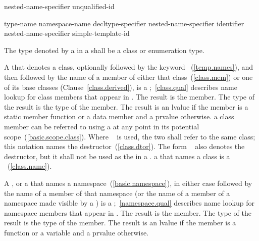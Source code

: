%
%
%
\begin{bnf}
\br
    nested-name-specifier \opt unqualified-id
\end{bnf}

%
%
%
\begin{bnf}
\br
    \terminal{::}\br
    type-name \terminal{::}\br
    namespace-name \terminal{::}\br
    decltype-specifier \terminal{::}\br
    nested-name-specifier identifier \terminal{::}\br
    nested-name-specifier \opt simple-template-id \terminal{::}
\end{bnf}

The type denoted by a  in a
 shall be a class or enumeration
type.

\pnum
A  that denotes a class, optionally
followed by the keyword ~(\ref{temp.names}), and then
followed by the name of a member of either that class~(\ref{class.mem})
or one of its base classes (Clause~\ref{class.derived}), is a
%
;~\ref{class.qual} describes name lookup for
class members that appear in . The result is the
member. The type of the result is the type of the member. The result is
an lvalue if the member is a static member function or a data member and a
prvalue otherwise.
\enternote 
a class member can be referred to using a  at any
point in its potential scope~(\ref{basic.scope.class}).
\exitnote 
Where
 \tcode{::\tilde}~ is used,
the two  shall refer to the same class; this
notation names the destructor~(\ref{class.dtor}).
The form \tcode{\tilde}~ also denotes the destructor,
but it shall not be used as the  in a .
\enternote 
a  that names a class is a
~(\ref{class.name}).
\exitnote 

\pnum
A \tcode{::}, or a  that names a
namespace~(\ref{basic.namespace}), in either case followed by the name of a member of
that namespace (or the name of a member of a namespace made visible by a
) is a
%
;~\ref{namespace.qual} describes name lookup for
namespace members that appear in . The result is
the member. The type of the result is the type of the member. The result
is an lvalue if the member is a function or a variable and a prvalue otherwise.


